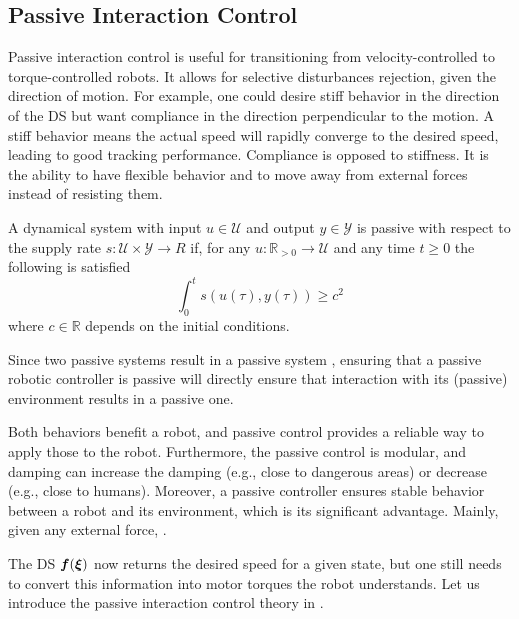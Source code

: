 \documentclass[conference]{IEEEtran}
\begin{document}
\subsection{Passive Interaction Control} \label{sec:trad_passive}
Passive interaction control \cite{kronander2015passive}is useful for transitioning from velocity-controlled to torque-controlled robots. It allows for selective disturbances rejection, given the direction of motion. For example, one could desire stiff behavior in the direction of the DS but want compliance in the direction perpendicular to the motion.
A stiff behavior means the actual speed will rapidly converge to the desired speed, leading to good tracking performance. Compliance is opposed to stiffness. It is the ability to have flexible behavior and to move away from external forces instead of resisting them.

\begin{definition}
  A dynamical system with input $ u \in \mathcal{U}$ and output $y \in \mathcal{Y}$ is passive with respect to the supply rate $s : \mathcal{U} \times \mathcal{Y} \rightarrow{R}$ if, for any $u: \mathbb{R}_{>0} \rightarrow \mathcal{U}$ and any time $t \geq 0$ the following is satisfied
  \begin{equation}
    \int_0^t s \left( u(\tau),  y (\tau) \right) \geq c^2
  \end{equation}
  where $c \in \mathbb{R}$ depends on the initial conditions.
\end{definition}

Since two passive systems result in a passive system \cite{sepulchre2012constructive}, ensuring that a passive robotic controller is passive will directly ensure that interaction with its (passive) environment results in a passive one.

Both behaviors benefit a robot, and passive control provides a reliable way to apply those to the robot.
Furthermore, the passive control is modular, and damping can increase the damping (e.g., close to dangerous areas) or decrease (e.g., close to humans). Moreover, a passive controller ensures stable behavior between a robot and its environment, which is its significant advantage. Mainly, given any external force,
.

The DS $\boldsymbol{f}(\boldsymbol{\xi})$ now returns the desired speed for a given state, but one still needs to convert this information into motor torques the robot understands. Let us introduce the passive interaction control theory in \cite{kronander2015passive}.
\end{document}
